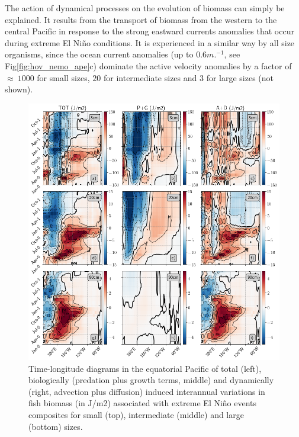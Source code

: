 The action of dynamical processes on the evolution of biomass can simply be explained. It results from the transport of biomass from the western to the central Pacific in response to the strong eastward currents anomalies that occur during extreme El Niño conditions. It is experienced in a similar way by all size organisms, since the ocean current anomalies (up to $0.6 m.^{-1}$, see Fig\ref{fig:hov_nemo_ape}c) dominate the active velocity anomalies by a factor of $\approx\ 1000$ for small sizes, $20$ for intermediate sizes and $3$ for large sizes (not shown).


\begin{figure}[h!tp]
	\centering
	\includegraphics[scale=0.4]{figs/fig7.png}	
	\caption{Time-longitude diagrams in the equatorial Pacific of total (left), biologically (predation plus growth terms, middle) and dynamically (right, advection plus diffusion) induced interannual variations in fish biomass (in J/m2) associated with extreme El Niño events composites for small (top), intermediate (middle) and large (bottom) sizes.}
	\label{fig:fig7}
\end{figure}

